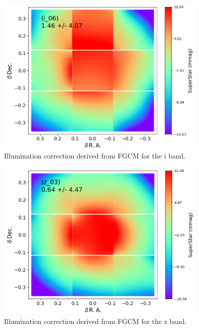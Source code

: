\begin{figure}
  \begin{center}
    \includegraphics[width=0.9\textwidth]{photometric_calibration_figures/illumcorr_i.png}
  \end{center}
  \caption{Illumination correction derived from FGCM for the i band.}
\end{figure}

\begin{figure}
  \begin{center}
    \includegraphics[width=0.9\textwidth]{photometric_calibration_figures/illumcorr_z.png}
  \end{center}
  \caption{Illumination correction derived from FGCM for the z band.}
\end{figure}


